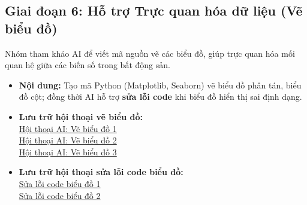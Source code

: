 \documentclass[12pt, a4paper]{article}
\begin{document}
\subsection{Giai đoạn 6: Hỗ trợ Trực quan hóa dữ liệu (Vẽ biểu đồ)}
Nhóm tham khảo AI để viết mã nguồn vẽ các biểu đồ, giúp trực quan hóa mối quan hệ giữa các biến số trong bất động sản.
\begin{itemize}[label=$\bullet$]
    \item \textbf{Nội dung:} Tạo mã Python (Matplotlib, Seaborn) vẽ biểu đồ phân tán, biểu đồ cột; đồng thời AI hỗ trợ \textbf{sửa lỗi code} khi biểu đồ hiển thị sai định dạng.
    \item \textbf{Lưu trữ hội thoại vẽ biểu đồ:} \\
    \href{https://aistudio.google.com/app/prompts?state=%7B%22ids%22:%5B%221-A-tJ_GuE37nGB-vTKfilWr9F7H3k-n0%22%5D,%22action%22:%22open%22,%22userId%22:%22103260168952391043836%22,%22resourceKeys%22:%7B%7D%7D&usp=sharing}{Hội thoại AI: Vẽ biểu đồ 1} \\
    \href{https://aistudio.google.com/app/prompts?state=%7B%22ids%22:%5B%221HYXIQLzRo6hbAUDPPzYW2a3CfhuSTGk0%22%5D,%22action%22:%22open%22,%22userId%22:%22103260168952391043836%22,%22resourceKeys%22:%7B%7D%7D&usp=sharing}{Hội thoại AI: Vẽ biểu đồ 2} \\
    \href{https://aistudio.google.com/app/prompts?state=%7B%22ids%22:%5B%221ZaXl3OZd2VTgztRxXtInD1UCngFf4jYs%22%5D,%22action%22:%22open%22,%22userId%22:%22109749123592071518780%22,%22resourceKeys%22:%7B%7D%7D&usp=sharing}{Hội thoại AI: Vẽ biểu đồ 3} \\
 
    \item \textbf{Lưu trữ hội thoại sửa lỗi code biểu đồ:} \\
    \href{https://aistudio.google.com/app/prompts?state=%7B%22ids%22:%5B%2212F37OMeKQPhyAVeLKSffSkzupc4P_EGR%22%5D,%22action%22:%22open%22,%22userId%22:%22103260168952391043836%22,%22resourceKeys%22:%7B%7D%7D&usp=sharing}{Sửa lỗi code biểu đồ 1} \\
    \href{https://aistudio.google.com/app/prompts?state=%7B%22ids%22:%5B%221RxEJ3ZqmgbnM76jTE46USJxel8-eFn8d%22%5D,%22action%22:%22open%22,%22userId%22:%22103260168952391043836%22,%22resourceKeys%22:%7B%7D%7D&usp=sharing}{Sửa lỗi code biểu đồ 2}
\end{itemize}
\end{document}
